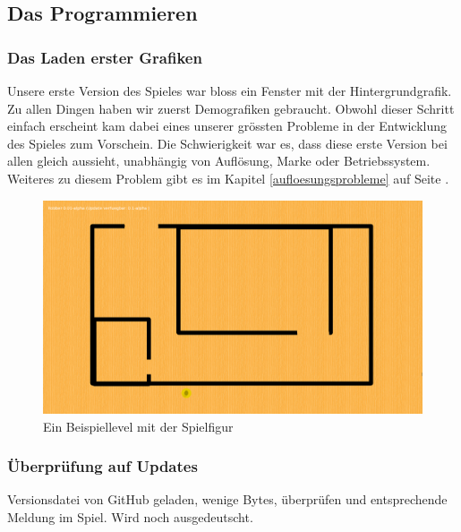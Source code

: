 \documentclass[12pt,a4paper]{scrartcl}
\begin{document}
\newpage
\subsection{Das Programmieren}
\subsubsection{Das Laden erster Grafiken}
Unsere erste Version des Spieles war bloss ein Fenster mit der Hintergrundgrafik.
Zu allen Dingen haben wir zuerst Demografiken gebraucht.
Obwohl dieser Schritt einfach erscheint kam dabei eines unserer grössten Probleme in der Entwicklung des Spieles zum Vorschein.
Die Schwierigkeit war es, dass diese erste Version bei allen gleich aussieht, unabhängig von Auflösung, Marke oder Betriebssystem.
Weiteres zu diesem Problem gibt es im Kapitel \ref{aufloesungsprobleme} auf Seite \pageref{aufloesungsprobleme}.


\begin{figure}[h]
\centering
\includegraphics[scale=0.25]{img/grafiken.png}
\caption{Ein Beispiellevel mit der Spielfigur}
\end{figure}


\subsubsection{Überprüfung auf Updates}
Versionsdatei von GitHub geladen, wenige Bytes, überprüfen und entsprechende Meldung im Spiel.
Wird noch ausgedeutscht.
\end{document}
